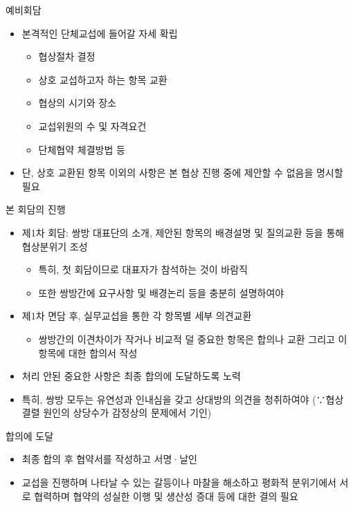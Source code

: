 \documentclass[aspectratio=169,xcolor=dvipsnames,handout]{beamer}
\begin{document}
\begin{frame}{예비회담}
    \begin{itemize}[<+->]
        \item 본격적인 단체교섭에 들어갈 자세 확립
        \begin{itemize}[<+->]
            \item 협상절차 결정
            \item 상호 교섭하고자 하는 항목 교환
            \item 협상의 시기와 장소
            \item 교섭위원의 수 및 자격요건
            \item 단체협약 체결방법 등
        \end{itemize}
    \item 단, 상호 교환된 항목 이외의 사항은 본 협상 진행 중에 제안할 수 없음을 명시할 필요
    \end{itemize}
\end{frame}

\begin{frame}{본 회담의 진행}
    \begin{itemize}[<+->]
        \item 제1차 회담: 쌍방 대표단의 소개, 제안된 항목의 배경설명 및 질의교환 등을 통해 협상분위기 조성
        \begin{itemize}[<+->]
            \item 특히, 첫 회담이므로 대표자가 참석하는 것이 바람직
            \item 또한 쌍방간에 요구사항 및 배경논리 등을 충분히 설명하여야
        \end{itemize}
        \item 제1차 면담 후, 실무교섭을 통한 각 항목별 세부 의견교환
        \begin{itemize}[<+->]
            \item 쌍방간의 이견차이가 작거나 비교적 덜 중요한 항목은 합의나 교환 그리고 이 항목에 대한 합의서 작성
        \end{itemize}
    \item 처리 안된 중요한 사항은 최종 합의에 도달하도록 노력
    \item 특히, 쌍방 모두는 유연성과 인내심을 갖고 상대방의 의견을 청취하여야 (∵협상 결렬 원인의 상당수가 감정상의 문제에서 기인)
    \end{itemize}
\end{frame}

\begin{frame}{합의에 도달}
    \begin{itemize}[<+->]
        \item 최종 합의 후 협약서를 작성하고 서명·날인
        \item 교섭을 진행하며 나타날 수 있는 갈등이나 마찰을 해소하고 평화적 분위기에서 서로 협력하며 협약의 성실한 이행 및 생산성 증대 등에 대한 결의 필요
    \end{itemize}
\end{frame}
\end{document}
